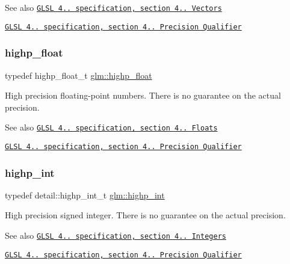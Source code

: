 \begin{DoxySeeAlso}{See also}
\href{http://www.opengl.org/registry/doc/GLSLangSpec.4.20.8.pdf}{\tt G\+L\+SL 4.. specification, section 4.. Vectors} 

\href{http://www.opengl.org/registry/doc/GLSLangSpec.4.20.8.pdf}{\tt G\+L\+SL 4.. specification, section 4.. Precision Qualifier} 
\end{DoxySeeAlso}
\mbox{\label{group__core__precision_ga3d443a093adc053638ed7f81c5bfe300}} 
\subsubsection{\texorpdfstring{highp\+\_\+float}{highp\_float}}
{\footnotesize\ttfamily typedef highp\+\_\+float\+\_\+t \hyperlink{group__core__precision_ga3d443a093adc053638ed7f81c5bfe300}{glm\+::highp\+\_\+float}}

High precision floating-\/point numbers. There is no guarantee on the actual precision.

\begin{DoxySeeAlso}{See also}
\href{http://www.opengl.org/registry/doc/GLSLangSpec.4.20.8.pdf}{\tt G\+L\+SL 4.. specification, section 4.. Floats} 

\href{http://www.opengl.org/registry/doc/GLSLangSpec.4.20.8.pdf}{\tt G\+L\+SL 4.. specification, section 4.. Precision Qualifier} 
\end{DoxySeeAlso}
\mbox{\label{group__core__precision_gaafed5240eb0a43328cb75faf5fb0a8c2}} 
\subsubsection{\texorpdfstring{highp\+\_\+int}{highp\_int}}
{\footnotesize\ttfamily typedef detail\+::highp\+\_\+int\+\_\+t \hyperlink{group__core__precision_gaafed5240eb0a43328cb75faf5fb0a8c2}{glm\+::highp\+\_\+int}}

High precision signed integer. There is no guarantee on the actual precision.

\begin{DoxySeeAlso}{See also}
\href{http://www.opengl.org/registry/doc/GLSLangSpec.4.20.8.pdf}{\tt G\+L\+SL 4.. specification, section 4.. Integers} 

\href{http://www.opengl.org/registry/doc/GLSLangSpec.4.20.8.pdf}{\tt G\+L\+SL 4.. specification, section 4.. Precision Qualifier} 
\end{DoxySeeAlso}
\mbox{\label{group__core__precision_ga01acd79fbbe3d93a532276586b5c39ee}} 
